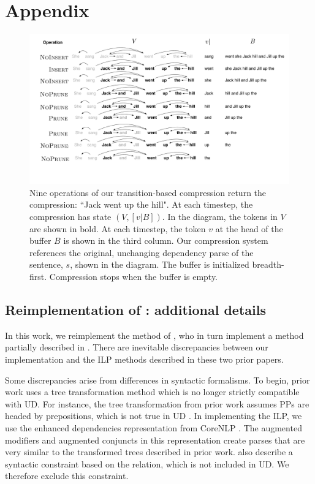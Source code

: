 
\section{Appendix}


\begin{figure}[htb!]
\centering
\includegraphics[width=.75\textwidth]{worked.pdf}
\caption{Nine operations of our transition-based compression return the compression: ``Jack went up the hill". At each timestep, the compression has state $(V, [v|B])$. In the diagram, the tokens in $V$ are shown in bold. At each timestep, the token $v$ at the head of the buffer $B$ is shown in the third column. Our compression system references the original, unchanging dependency parse of the sentence, $s$, shown in the diagram. The buffer is initialized breadth-first. Compression stops when the buffer is empty.}
\label{f:example}
\end{figure}

\subsection{Reimplementation of \citet{filippova2013overcoming}: additional details}

In this work, we reimplement the method of \citet{filippova2013overcoming}, who in turn implement a method partially described in \citet{filippova2008dependency}.  There are inevitable discrepancies between our implementation and the ILP methods described in these two prior papers.  

Some discrepancies arise from differences in syntactic formalisms. To begin, prior work uses a tree transformation method which is no longer strictly compatible with UD. For instance, the tree transformation from prior work assumes PPs are headed by prepositions, which is not true in UD \cite{Schuster2016EnhancedEU}. In implementing the ILP, we use the enhanced dependencies representation from CoreNLP \cite{Schuster2016EnhancedEU}. The augmented modifiers and augmented conjuncts in this representation create parses that are very similar to the transformed trees described in prior work. \citet{filippova2008dependency} also describe a syntactic constraint based on the  relation, which is not included in UD. We therefore exclude this constraint.

